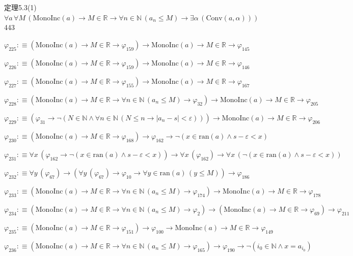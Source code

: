 \begin{fullproof}{定理5.3(1)}{$\forall a\,\forall M\,(\mathrm{MonoInc}(a) \to M \in \mathbb{R} \to \forall n \in \mathbb{N}\,(a_{n} \leq M) \to \exists \alpha\,(\mathrm{Conv}(a,\alpha)))$}{443}
\begin{abbrevlist}
\item $\varphi_{225} :\equiv (\mathrm{MonoInc}(a) \to M \in \mathbb{R} \to \varphi_{159}) \to \mathrm{MonoInc}(a) \to M \in \mathbb{R} \to \varphi_{145}$
\item $\varphi_{226} :\equiv (\mathrm{MonoInc}(a) \to M \in \mathbb{R} \to \varphi_{159}) \to \mathrm{MonoInc}(a) \to M \in \mathbb{R} \to \varphi_{146}$
\item $\varphi_{227} :\equiv (\mathrm{MonoInc}(a) \to M \in \mathbb{R} \to \varphi_{155}) \to \mathrm{MonoInc}(a) \to M \in \mathbb{R} \to \varphi_{167}$
\item $\varphi_{228} :\equiv (\mathrm{MonoInc}(a) \to M \in \mathbb{R} \to \forall n \in \mathbb{N}\,(a_{n} \leq M) \to \varphi_{32}) \to \mathrm{MonoInc}(a) \to M \in \mathbb{R} \to \varphi_{205}$
\item $\varphi_{229} :\equiv (\varphi_{31} \to \neg (N \in \mathbb{N} \land \forall n \in \mathbb{N}\,(N \leq n \to \lvert a_{n} - s \rvert < \varepsilon))) \to \mathrm{MonoInc}(a) \to M \in \mathbb{R} \to \varphi_{206}$
\item $\varphi_{230} :\equiv (\mathrm{MonoInc}(a) \to M \in \mathbb{R} \to \varphi_{168}) \to \varphi_{162} \to \neg (x \in \mathrm{ran}(a) \land s - \varepsilon < x)$
\item $\varphi_{231} :\equiv \forall x\,(\varphi_{162} \to \neg (x \in \mathrm{ran}(a) \land s - \varepsilon < x)) \to \forall x\,(\varphi_{162}) \to \forall x\,(\neg (x \in \mathrm{ran}(a) \land s - \varepsilon < x))$
\item $\varphi_{232} :\equiv \forall y\,(\varphi_{67}) \to (\forall y\,(\varphi_{67}) \to \varphi_{10} \to \forall y \in \mathrm{ran}(a)\,(y \leq M)) \to \varphi_{186}$
\item $\varphi_{233} :\equiv (\mathrm{MonoInc}(a) \to M \in \mathbb{R} \to \forall n \in \mathbb{N}\,(a_{n} \leq M) \to \varphi_{174}) \to \mathrm{MonoInc}(a) \to M \in \mathbb{R} \to \varphi_{178}$
\item $\varphi_{234} :\equiv (\mathrm{MonoInc}(a) \to M \in \mathbb{R} \to \forall n \in \mathbb{N}\,(a_{n} \leq M) \to \varphi_{2}) \to (\mathrm{MonoInc}(a) \to M \in \mathbb{R} \to \varphi_{69}) \to \varphi_{211}$
\item $\varphi_{235} :\equiv (\mathrm{MonoInc}(a) \to M \in \mathbb{R} \to \varphi_{151}) \to \varphi_{100} \to \mathrm{MonoInc}(a) \to M \in \mathbb{R} \to \varphi_{149}$
\item $\varphi_{236} :\equiv (\mathrm{MonoInc}(a) \to M \in \mathbb{R} \to \forall n \in \mathbb{N}\,(a_{n} \leq M) \to \varphi_{165}) \to \varphi_{190} \to \neg (i_{0} \in \mathbb{N} \land x = a_{i_{0}})$

\end{abbrevlist}
\end{fullproof}
